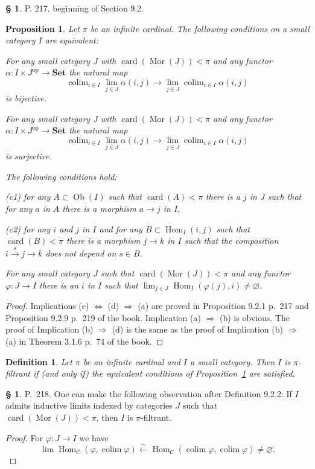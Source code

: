 \documentclass[12pt]{article}%
\newtheorem{prop}[thm]{Proposition}
\newtheorem{df}[thm]{Definition}%
\theoremstyle{remark}
\theoremstyle{definition}
\newtheorem{s}[thm]{\S}%
\newcommand{\nn}{\noindent}
\newcommand{\C}{\mathcal C}
\newcommand{\Set}{\mathbf{Set}}
\newcommand{\pp}{\varphi}
\newcommand{\then}{\Rightarrow}
\newcommand{\ssi}{\Leftrightarrow}%
\newcommand{\xr}{\xrightarrow}
\DeclareMathOperator*{\colim}{colim}
\DeclareMathOperator{\card}{card}%
\DeclareMathOperator{\Hom}{Hom}%
\DeclareMathOperator{\Mor}{Mor}
\DeclareMathOperator{\Ob}{Ob}
\DeclareMathOperator{\op}{op}
\begin{document}
\begin{s}
P. 217, beginning of Section 9.2. 

\begin{prop}\label{ppifil}
Let $\pi$ be an infinite cardinal. The following conditions on a small category $I$ are equivalent:

\nn{\em(a)} For any small category $J$ with $\card(\Mor(J))<\pi$ and any functor $\alpha:I\times J^{\op}\to\Set$ the natural map 
$$
\colim_{i\in I}\lim_{j\in J}\alpha(i,j)\to\lim_{j\in J}\colim_{i\in I}\alpha(i,j)
$$ 
is bijective.

\nn{\em(b)} For any small category $J$ with $\card(\Mor(J))<\pi$ and any functor $\alpha:I\times J^{\op}\to\Set$ the natural map 
$$
\colim_{i\in I}\lim_{j\in J}\alpha(i,j)\to\lim_{j\in J}\colim_{i\in I}\alpha(i,j)
$$ 
is surjective.

\nn{\em(c)} The following conditions hold:

{\em(c1)} for any $A\subset\Ob(I)$ such that $\card(A)<\pi$ there is a $j$ in $J$ such that for any $a$ in $A$ there is a morphism $a\to j$ in $I$,

{\em(c2)} for any $i$ and $j$ in $I$ and for any $B\subset\Hom_I(i,j)$ such that $\card(B)<\pi$ there is a morphism $j\to k$ in $I$ such that the composition $i\xr sj\to k$ does not depend on $s\in B$.

\nn{\em(d)} For any small category $J$ such that $\card(\Mor(J))<\pi$ and any functor $\pp:J\to I$ there is an $i$ in $I$ such that $\lim_{j\in J}\Hom_I(\pp(j),i)\neq\varnothing$. 
\end{prop}

\begin{proof}
Implications (c) $\ssi$ (d) $\then$ (a) are proved in Proposition 9.2.1 p.~217 and Proposition 9.2.9 p.~219 of the book. Implication (a) $\then$ (b) is obvious. The proof of Implication (b) $\then$ (d) is the same as the proof of Implication (b) $\then$ (a) in Theorem 3.1.6 p.~74 of the book.
\end{proof}

\begin{df}%
Let $\pi$ be an infinite cardinal and $I$ a small category. Then $I$ is $\pi$-{\em filtrant} if (and only if) the equivalent conditions of Proposition~\ref{ppifil} are satisfied.
\end{df}
\end{s}

%

\begin{s}\label{922}
P.~218. One can make the following observation after Definition 9.2.2: If $I$ admits inductive limits indexed by categories $J$ such that $\card(\Mor(J))<\pi$, then $I$ is $\pi$-filtrant.

\begin{proof}
For $\varphi:J\to I$ we have
$$
\lim\Hom_\C(\varphi,\colim\varphi)\xleftarrow\sim\Hom_\C(\colim\varphi,\colim\varphi)\neq\varnothing.
$$
\end{proof}
\end{s}
\end{document}
